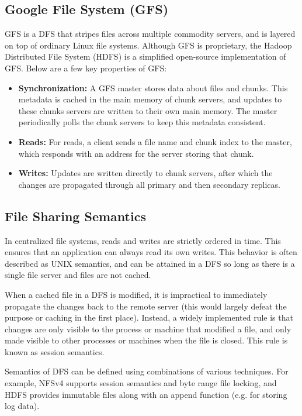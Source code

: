 \documentclass[12pt,titlepage]{article}
\begin{document}
    \subsection{Google File System (GFS)}
      GFS is a DFS that stripes files across multiple commodity servers, and is layered on top of ordinary Linux file systems. Although GFS is proprietary, the
      Hadoop Distributed File System (HDFS) is a simplified open-source implementation of GFS. Below are a few key properties of GFS:
      \begin{itemize}
        \item \textbf{Synchronization:} A GFS master stores data about files and chunks. This metadata is cached in the main memory of chunk servers, and updates to
        these chunks servers are written to their own main memory. The master periodically polls the chunk servers to keep this metadata consistent.
        \item \textbf{Reads:} For reads, a client sends a file name and chunk index to the master, which responds with an address for the server storing that chunk.
        \item \textbf{Writes:} Updates are written directly to chunk servers, after which the changes are propagated through all primary and then secondary replicas.
      \end{itemize}

    \subsection{File Sharing Semantics}
      In centralized file systems, reads and writes are strictly ordered in time. This ensures that an application can always read its own writes. This behavior is
      often described as UNIX semantics, and can be attained in a DFS so long as there is a single file server and files are not cached.

      When a cached file in a DFS is modified, it is impractical to immediately propagate the changes back to the remote server (this would largely defeat the purpose
      or caching in the first place). Instead, a widely implemented rule is that changes are only visible to the process or machine that modified a file, and only made
      visible to other processes or machines when the file is closed. This rule is known as session semantics.

      Semantics of DFS can be defined using combinations of various techniques. For example, NFSv4 supports session semantics and byte range file locking, and HDFS
      provides immutable files along with an append function (e.g. for storing log data).
\end{document}

